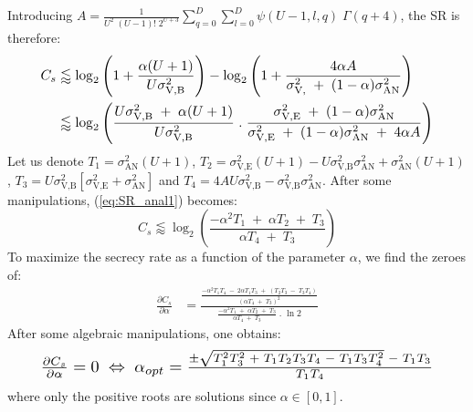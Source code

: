 \documentclass[a4paper,11pt]{article}
\begin{document}
Introducing $A = \frac{1}{U^2 \; (U-1)!\; 2^{U+3}} \sum_{q=0}^{D}\sum_{l=0}^{D} \psi(U-1,l,q) \; \Gamma(q+4)$, the SR is therefore:
\begin{equation}
\resizebox{0.89\hsize}{!}{$
\begin{split}
    C_s &\lessapprox \log_2 \left(1 + \frac{\alpha (U+1)}{U \sigma_{\text{V,B}}^2} \right)  - \log_2\left( 1 + \frac{4\alpha A }{\sigma^2_{\text{V,}} \; + \; (1-\alpha) \sigma^2_{\text{AN}} } \right)\\
    &\lessapprox \log_2 \left( \frac{U \sigma_{\text{V,B}}^2 \; + \; \alpha (U+1)}{U  \sigma_{\text{V,B}}^2} \; . \; \frac{\sigma^2_{\text{V,E}} \; + \; (1-\alpha) \sigma^2_{\text{AN}}}{\sigma^2_{\text{V,E}} \; + \; (1-\alpha) \sigma^2_{\text{AN}} \; + \; 4\alpha A } \right)
    \label{eq:SR_anal1}
\end{split}$}
\end{equation}
Let us denote $T_1 = \sigma^2_{\text{AN}}(U+1)$, $T_2 = \sigma^2_{\text{V,E}}(U+1) -  U \sigma_{\text{V,B}}^2\sigma^2_{\text{AN}}  + \sigma^2_{\text{AN}}(U+1)$, $T_3 = U \sigma_{\text{V,B}}^2 \left[ \sigma^2_{\text{V,E}}  +  \sigma^2_{\text{AN}}\right]$ and $T_4 = 4A U \sigma_{\text{V,B}}^2 -  \sigma_{\text{V,B}}^2\sigma^2_{\text{AN}}$. After some manipulations, (\ref{eq:SR_anal1}) becomes:
\begin{equation}
    C_s \lessapprox \log_2 \left( \frac{-\alpha^2 T_1 \; + \; \alpha T_2 \; + \; T_3}{\alpha T_4 \; + \; T_3} \right)
    \label{eq:SR_anal2}
\end{equation}
To  maximize the secrecy rate as a function of the parameter $\alpha$, we find the zeroes of:
\begin{equation}
\begin{split}
    \frac{\partial C_s}{\partial \alpha} &= \frac{ \frac{-\alpha^2 T_1 T_4 \; - \; 2 \alpha T_1 T_3 \; + \; \left( T_2 T_3 \; - \; T_3 T_4 \right) }{\left( \alpha T_4 \; + \; T_3\right)^2} }{ \frac{-\alpha^2 T_1 \; + \; \alpha T_2 \; + \; T_3}{\alpha T_4 \; + \; T_3} \; . \; \ln{2}} 
    \label{eq:SR_derivative}
\end{split}
\end{equation}
After some algebraic manipulations, one obtains: 
\begin{equation}
\resizebox{0.89\hsize}{!}{$
         \frac{\partial C_s}{\partial \alpha} = 0
         \; \Leftrightarrow \; \alpha_{opt} = \frac{\pm\sqrt{T_1^2 T_3^2 \; + \; T_1 T_2 T_3 T_4 \; - \; T_1 T_3 T_4^2} \; - \; T_1 T_3}{T_1 T_4}$}
         \label{eq:best_alpha}
\end{equation}
where only the positive roots are solutions since $\alpha \in [0,1]$.
\end{document}

